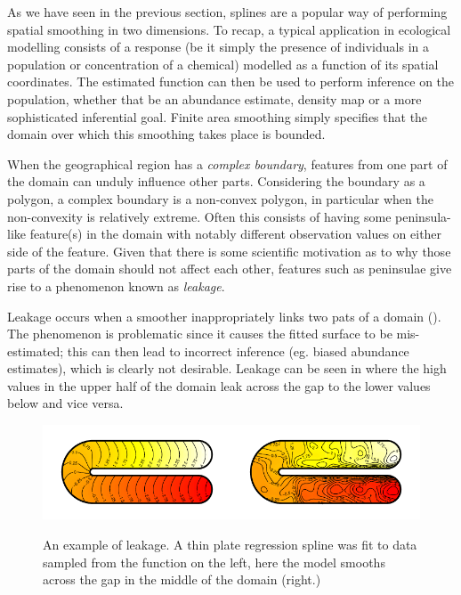 As we have seen in the previous section, splines are a popular way of performing spatial smoothing in two dimensions. To recap, a typical application in ecological modelling consists of a response (be it simply the presence of individuals in a population or concentration of a chemical) modelled as a function of its spatial coordinates. The estimated function can then be used to perform inference on the population, whether that be an abundance estimate, density map or a more sophisticated inferential goal. Finite area smoothing simply specifies that the domain over which this smoothing takes place is bounded.

When the geographical region has a \emph{complex boundary}, features from one part of the domain can unduly influence other parts. Considering the boundary as a polygon, a complex boundary is a non-convex polygon, in particular when the non-convexity is relatively extreme. Often this consists of having some peninsula-like feature(s) in the domain with notably different observation values on either side of the feature. Given that there is some scientific motivation as to why those parts of the domain should not affect each other, features such as peninsulae give rise to a phenomenon known as \emph{leakage}.

Leakage occurs when a smoother inappropriately links two pats of a domain (\cite{soap}). The phenomenon is problematic since it causes the fitted surface to be mis-estimated; this can then lead to incorrect inference (eg. biased abundance estimates), which is clearly not desirable. Leakage can be seen in  where the high values in the upper half of the domain leak across the gap to the lower values below and vice versa.

\begin{figure}
\centering
\includegraphics{intro/figs/ramsay-leak.pdf}\\
\caption{An example of leakage. A thin plate regression spline was fit to data sampled from the function on the left, here the model smooths across the gap in the middle of the domain (right.)}
\label{leakage}
\end{figure}

